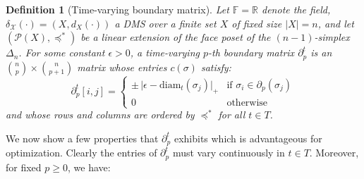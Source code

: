 \documentclass[10pt]{article}
\newtheorem{definition}{Definition}
\begin{document}
\begin{definition}[Time-varying boundary matrix]\label{def:time_boundary_matrix}
Let $\mathbb{F} = \mathbb{R}$ denote the field, $\delta_{\mathcal{X}}(\cdot) = (X, d_X(\cdot))$ a DMS over a finite set $X$ of fixed size $\lvert X \rvert = n$, and let $(\mathcal{P}(X), \preceq^\ast)$ be a linear extension of the face poset of the $(n-1)$-simplex $\Delta_n$. For some constant $\epsilon > 0$, a time-varying $p$-th boundary matrix $\partial_p^t$ is an $\binom{n}{p} \times \binom{n}{p+1}$ matrix whose entries $c(\sigma)$ satisfy:
$$
\partial_p^t[i,j] = \begin{cases}
	\pm \, \lvert \epsilon - \mathrm{diam}_t(\sigma_j) \rvert_{+} & \text{if } \sigma_i \in \partial_p(\sigma_j)\\
	0 & \text{otherwise}
\end{cases} 
$$
and whose rows and columns are ordered by $\preceq^\ast$ for all $t \in T$.%
\end{definition}
\noindent
We now show a few properties that $\partial_p^t$ exhibits which is advantageous for optimization. Clearly the entries of $\partial_p^t$ must vary continuously in $t \in T$. Moreover, for fixed $p \geq 0$, we have:
% 
\end{document}
